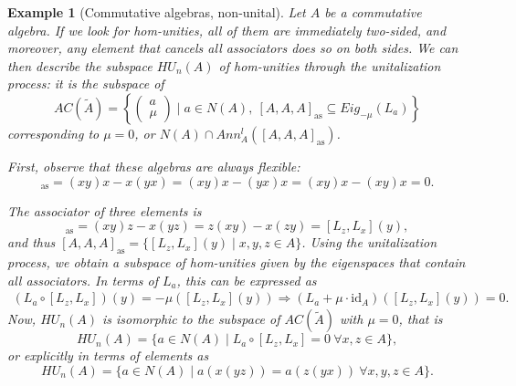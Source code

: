 \documentclass[12pt]{article}
\newtheorem{example}[theorem]{Example}
\begin{document}
		\begin{example}[Commutative algebras, non-unital]
			Let $A$ be a commutative algebra. If we look for hom-unities, all of them are immediately two-sided, and moreover, any element that cancels all associators does so on both sides. We can then describe the subspace $HU_n(A)$ of hom-unities through the unitali\-zation process: it is the subspace of
			$$AC(\tilde{A})=\left\{\begin{pmatrix}
				a \\ \mu
			\end{pmatrix}\mid a\in N(A),\ [A,A,A]_{\mathrm{as}}\subseteq Eig_{-\mu}(L_a) \right\}$$
			corresponding to $\mu=0$, or $N(A)\cap Ann_A^l([A,A,A]_{\mathrm{as}})$.
			
			First, observe that these algebras are always flexible:
			\begin{equation*}
				[x,y,x]_{\mathrm{as}}=(xy)x-x(yx)=(xy)x-(yx)x=(xy)x-(xy)x=0.
			\end{equation*}
			
			The associator of three elements is
			\begin{equation*}
				[x,y,z]_{\mathrm{as}}=(xy)z-x(yz)=z(xy)-x(zy)=[L_z,L_x](y),
			\end{equation*}
			and thus $[A,A,A]_{\mathrm{as}}=\{[L_z,L_x](y)\mid x,y,z\in A\}$. Using the unitalization process, we obtain a subspace of hom-unities given by the eigenspaces that contain all associators. In terms of $L_a$, this can be expressed as
			\begin{align*}
				(L_a\circ [L_z,L_x])(y)=-\mu([L_z,L_x](y))\Rightarrow (L_a+\mu\cdot \mathrm{id}_A)([L_z,L_x](y))=0.
			\end{align*}
			Now, $HU_n(A)$ is isomorphic to the subspace of $AC(\tilde{A})$ with $\mu=0$, that is
			\begin{equation*}
				HU_n(A)=\{a\in N(A)\mid L_a\circ[L_z,L_x]=0\ \forall x,z\in A \},
			\end{equation*}
			or explicitly in terms of elements as
			\begin{equation*}
				HU_n(A)=\{a\in N(A)\mid a(x(yz))=a(z(yx))\ \forall x,y,z\in A \}.
			\end{equation*}
		\end{example}
		
		
		
\end{document}
